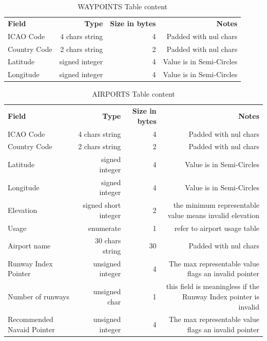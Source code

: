 \documentclass{article}
\newcommand\strpad{Padded with nul chars}
\newcommand\SemiCircle{Value is in Semi-Circles}
\newcommand\InvalidPointVal{The max representable value flags an invalid pointer}
\begin{document}
\begin{table}[H]
   \caption{WAYPOINTS Table content} 
   \label{tab:WPT}
   \small
   \begin{tabular}{|l|r|r|r|}
   \textbf{Field} & \textbf{Type} & \textbf{Size in bytes} & \textbf{Notes} \\ 
   ICAO Code & 4 chars string & 4 & \strpad \\
   Country Code & 2 chars string & 2 &\strpad \\
   Latitude & signed integer & 4 & \SemiCircle\\
   Longitude & signed integer & 4& \SemiCircle\\
   \end{tabular}
\end{table}
\begin{table}[H]
   \caption{AIRPORTS Table content} 
   \label{tab:APT}
   \small
   \begin{tabular}{|l|r|r|r|}
   \textbf{Field} & \textbf{Type} & \textbf{Size in bytes} & \textbf{Notes} \\ 
   ICAO Code & 4 chars string & 4 & \strpad \\
   Country Code & 2 chars string & 2 &\strpad \\
   Latitude & signed integer & 4 & \SemiCircle\\
   Longitude & signed integer & 4& \SemiCircle\\
   Elevation & signed short integer & 2 & the minimum representable value means invalid elevation\\
   Usage & enumerate & 1 & refer to airport usage table\\
   Airport name & 30 chars string & 30 & \strpad \\
   Runway Index Pointer & unsigned integer & 4 & \InvalidPointVal\\
   Number of runways & unsigned char & 1 & this field is meaningless if the Runway Index pointer is invalid\\
   Recommended Navaid Pointer & unsigned integer & 4 & \InvalidPointVal\\
  \end{tabular}
\end{table}
\end{document}
